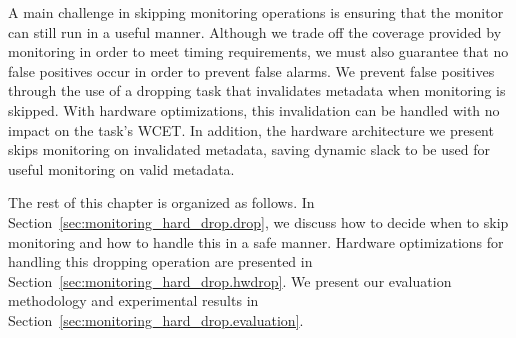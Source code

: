 A main challenge in skipping monitoring operations is ensuring that the monitor
can still run in a useful manner. Although we trade off the coverage provided
by monitoring in order to meet timing requirements, we must also  guarantee
that no false positives occur in order to prevent false alarms.
We prevent false positives through the use of a dropping task that invalidates
metadata when monitoring is skipped.
With hardware optimizations, this invalidation can be handled with no impact on
the task's WCET. In addition, the hardware architecture we present skips
monitoring on invalidated metadata, saving dynamic slack to be used for useful
monitoring on valid metadata.

The rest of this chapter is organized as follows. In
Section~\ref{sec:monitoring_hard_drop.drop}, we discuss how to decide when to
skip monitoring and how to handle this in a safe manner. Hardware optimizations
for handling this dropping operation are presented in
Section~\ref{sec:monitoring_hard_drop.hwdrop}. We present our evaluation
methodology and experimental results in
Section~\ref{sec:monitoring_hard_drop.evaluation}. 

